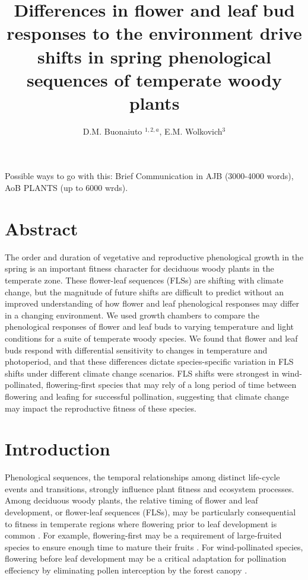 \documentclass[11pt]{article}
\title{Differences in flower and leaf bud responses to the environment drive shifts in spring phenological sequences of temperate woody plants}\\
\date{}
\author{D.M. Buonaiuto $^{1,2,a}$, E.M. Wolkovich$^{3}$}
\begin{document}
\maketitle

Possible ways to go with this: Brief Communication in AJB (3000-4000 words),  AoB PLANTS (up to 6000 wrds). \\ 

\section*{Abstract}
The order and duration of vegetative and reproductive phenological growth in the spring is an important fitness character for deciduous woody plants in the temperate zone. These flower-leaf sequences (FLSs) are shifting with climate change, but the magnitude of future shifts are difficult to predict without an improved understanding of how flower and leaf phenological responses may differ in a changing environment. We used growth chambers to compare the phenological responses of flower and leaf buds to varying temperature and light conditions for a suite of temperate woody species. We found that flower and leaf buds respond with differential sensitivity to changes in temperature and photoperiod, and that these differences dictate species-specific variation in FLS shifts under different climate change scenarios. FLS shifts were strongest in wind-pollinated, flowering-first species that may rely of a long period of time between flowering and leafing for successful pollination, suggesting that climate change may impact the reproductive fitness of these species. 


\section*{Introduction}
\noindent  Phenological sequences, the temporal relationships among distinct life-cycle events and transitions, strongly influence plant fitness \citep{Ettinger2018,Post:2008aa} and ecosystem processes. Among deciduous woody plants, the relative timing of flower and leaf development, or flower-leaf sequences (FLSs), may be particularly consequential to fitness in temperate regions where flowering prior to leaf development is common \citep{Rathcke_1985,Gougherty2018}. \noindent For example, flowering-first may be a requirement of large-fruited species to ensure enough time to mature their fruits \citep{}. For wind-pollinated species, flowering before leaf development may be a critical adaptation for pollination effeciency by eliminating pollen interception by the forest canopy \citep{Whitehead1969}.\\
\end{document}
